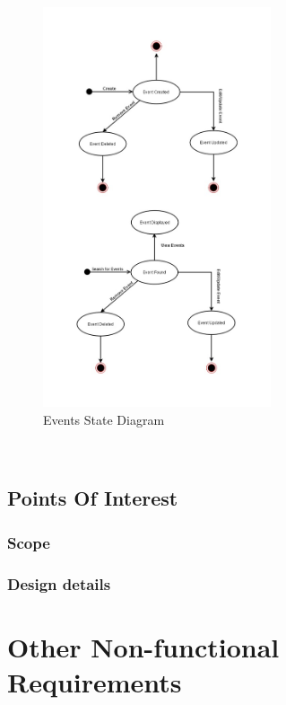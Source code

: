 \documentclass{article}
\begin{document}
    
    \begin{figure}[h!]
        \begin{center}
            \includegraphics[width=0.6\textwidth]{Events/Images/StateDiagramEvent.jpg} \caption{Events State Diagram}
        \end{center}
    \end{figure}
    
    \mbox{}\\
    \bigskip
    \clearpage
    \newpage
    
\subsection{Points Of Interest}
\subsubsection{Scope}

\subsubsection{Design details}

\section{Other Non-functional Requirements}
\end{document}
